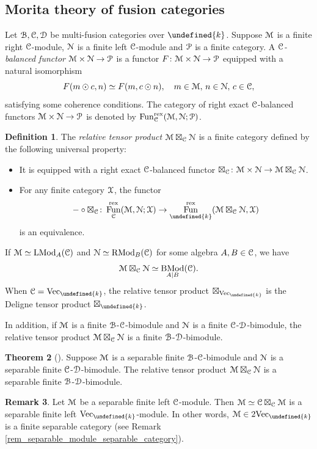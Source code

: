 \documentclass[10pt]{article}
\let\mathbb\undefined
\theoremstyle{definition}
\newtheorem{thm}{Theorem}[section]
\newtheorem{defn}[thm]{Definition}
\newtheorem{rem}[thm]{Remark}
\numberwithin{equation}{section}
\numberwithin{thm}{section}
\newcommand{\bit}{\begin{itemize}}
\newcommand{\eit}{\end{itemize}}
\newcommand{\bk}{\mathbb{k}}
\newcommand{\CB}{\EuScript{B}}
\newcommand{\CC}{\EuScript{C}}
\newcommand{\CD}{\EuScript{D}}
\newcommand{\CM}{\EuScript{M}}
\newcommand{\CN}{\EuScript{N}}
\newcommand{\CP}{\EuScript{P}}
\newcommand{\CX}{\EuScript{X}}
\DeclareMathOperator{\fun}{Fun}
\DeclareMathOperator{\LMod}{LMod}
\DeclareMathOperator{\RMod}{RMod}
\DeclareMathOperator{\BMod}{BMod}
\newcommand{\vect}{\mathrm{Vec}}
\newcommand{\rex}{\mathrm{rex}}
\begin{document}
\subsection{Morita theory of fusion categories}

Let $\CB,\CC,\CD$ be multi-fusion categories over $\bk$. Suppose $\CM$ is a finite right $\CC$-module, $\CN$ is a finite left $\CC$-module and $\CP$ is a finite category. A \emph{$\CC$-balanced functor} $\CM \times \CN \to \CP$ is a functor $F \colon \CM \times \CN \to \CP$ equipped with a natural isomorphism
\[
F(m \odot c,n) \simeq F(m,c \odot n) , \quad m \in \CM , \, n \in \CN , \, c \in \CC ,
\]
satisfying some coherence conditions. The category of right exact $\CC$-balanced functors $\CM \times \CN \to \CP$ is denoted by $\fun_\CC^\rex(\CM,\CN;\CP)$.

\begin{defn}
The \emph{relative tensor product} $\CM \boxtimes_\CC \CN$ is a finite category defined by the following universal property:
\bit
\item It is equipped with a right exact $\CC$-balanced functor $\boxtimes_\CC \colon \CM \times \CN \to \CM \boxtimes_\CC \CN$.
\item For any finite category $\CX$, the functor
\[
- \circ \boxtimes_\CC \colon \fun_\CC^\rex(\CM,\CN;\CX) \to \fun_\bk^\rex(\CM \boxtimes_\CC \CN,\CX)
\]
is an equivalence.
\eit
\end{defn}

If $\CM \simeq \LMod_A(\CC)$ and $\CN \simeq \RMod_B(\CC)$ for some algebra $A,B \in \CC$, we have
\[
\CM \boxtimes_\CC \CN \simeq \BMod_{A|B}(\CC) .
\]
When $\CC = \vect_\bk$, the relative tensor product $\boxtimes_{\vect_\bk}$ is the Deligne tensor product $\boxtimes_\bk$.

In addition, if $\CM$ is a finite $\CB$-$\CC$-bimodule and $\CN$ is a finite $\CC$-$\CD$-bimodule, the relative tensor product $\CM \boxtimes_\CC \CN$ is a finite $\CB$-$\CD$-bimodule.

\begin{thm}[\textnormal{\cite[Theorem 3.5.5]{DSPS20}}] \label{thm_separable_module_relative_tensor}
Suppose $\CM$ is a separable finite $\CB$-$\CC$-bimodule and $\CN$ is a separable finite $\CC$-$\CD$-bimodule. The relative tensor product $\CM \boxtimes_\CC \CN$ is a separable finite $\CB$-$\CD$-bimodule.
\end{thm}

\begin{rem}
Let $\CM$ be a separable finite left $\CC$-module. Then $\CM \simeq \CC \boxtimes_\CC \CM$ is a separable finite left $\vect_\bk$-module. In other words, $\CM \in 2\vect_\bk$ is a finite separable category (see Remark \ref{rem_separable_module_separable_category}).
\end{rem}
\end{document}

